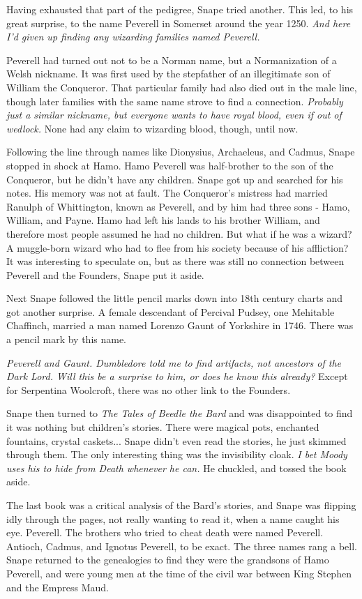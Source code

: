 \documentclass[a4paper,11pt]{article}
\begin{document}
Having exhausted that part of the pedigree, Snape tried another. This led, to his great surprise, to the name Peverell in Somerset around the year 1250. \emph{And here I'd given up finding any wizarding families named Peverell.}

Peverell had turned out not to be a Norman name, but a Normanization of a Welsh nickname. It was first used by the stepfather of an illegitimate son of William the Conqueror. That particular family had also died out in the male line, though later families with the same name strove to find a connection. \emph{Probably just a similar nickname, but everyone wants to have royal blood, even if out of wedlock.} None had any claim to wizarding blood, though, until now.

Following the line through names like Dionysius, Archaeleus, and Cadmus, Snape stopped in shock at Hamo. Hamo Peverell was half-brother to the son of the Conqueror, but he didn't have any children. Snape got up and searched for his notes. His memory was not at fault. The Conqueror's mistress had married Ranulph of Whittington, known as Peverell, and by him had three sons - Hamo, William, and Payne. Hamo had left his lands to his brother William, and therefore most people assumed he had no children. But what if he was a wizard? A muggle-born wizard who had to flee from his society because of his affliction? It was interesting to speculate on, but as there was still no connection between Peverell and the Founders, Snape put it aside.

Next Snape followed the little pencil marks down into 18th century charts and got another surprise. A female descendant of Percival Pudsey, one Mehitable Chaffinch, married a man named Lorenzo Gaunt of Yorkshire in 1746. There was a pencil mark by this name.

\emph{Peverell and Gaunt. Dumbledore told me to find artifacts, not ancestors of the Dark Lord. Will this be a surprise to him, or does he know this already?} Except for Serpentina Woolcroft, there was no other link to the Founders.

Snape then turned to \emph{The Tales of Beedle the Bard} and was disappointed to find it was nothing but children's stories. There were magical pots, enchanted fountains, crystal caskets... Snape didn't even read the stories, he just skimmed through them. The only interesting thing was the invisibility cloak. \emph{I bet Moody uses his to hide from Death whenever he can.} He chuckled, and tossed the book aside.

The last book was a critical analysis of the Bard's stories, and Snape was flipping idly through the pages, not really wanting to read it, when a name caught his eye. Peverell. The brothers who tried to cheat death were named Peverell. Antioch, Cadmus, and Ignotus Peverell, to be exact. The three names rang a bell. Snape returned to the genealogies to find they were the grandsons of Hamo Peverell, and were young men at the time of the civil war between King Stephen and the Empress Maud.
\end{document}
